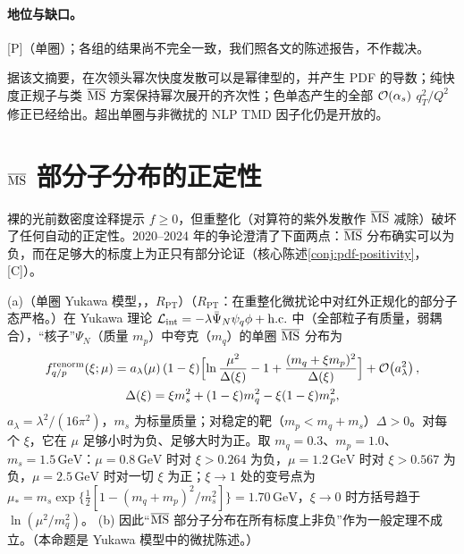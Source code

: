 \paragraph{地位与缺口。}[P]（单圈）；各组的结果尚不完全一致，我们照各文的陈述报告，不作裁决。

\begin{remark}[次领头幂次的幂律快度发散]\label{rem:front-power-rapidity}
据该文摘要\cite{Ebert:2018gsn}，在次领头幂次快度发散可以是幂律型的，并产生 PDF 的导数；纯快度正规子与类 $\overline{\mathrm{MS}}$ 方案保持幂次展开的齐次性；色单态产生的全部 $\mathcal{O}\!\left(\alpha_s\right)$ $q_T^2/Q^2$ 修正已经给出。超出单圈与非微扰的 NLP TMD 因子化仍是开放的。
\end{remark}

\section{$\overline{\mathrm{MS}}$ 部分子分布的正定性}\label{sec:front-positivity}

裸的光前数密度诠释提示 $f\ge0$，但重整化（对算符的紫外发散作 $\overline{\mathrm{MS}}$ 减除）破坏了任何自动的正定性。2020--2024 年的争论澄清了下面两点：$\overline{\mathrm{MS}}$ 分布确实可以为负，而在足够大的标度上为正只有部分论证（核心陈述\cref{conj:pdf-positivity}，[C]）。

\begin{proposition}\label{prop:front-msbar-negative}
(a)（单圈 Yukawa 模型，\tagR，$R_{\mathrm{PT}}$）（$R_{\mathrm{PT}}$：在重整化微扰论中对红外正规化的部分子态严格。）在 Yukawa 理论 $\mathcal L_{\rm int}=-\lambda\bar\Psi_N\psi_q\phi+{\rm h.c.}$ 中（全部粒子有质量，弱耦合），“核子”$\Psi_N$（质量 $m_p$）中夸克（$m_q$）的单圈 $\overline{\mathrm{MS}}$ 分布为
\begin{equation}\label{eq:front-yukawa}
\begin{gathered}
f^{\rm renorm}_{q/p}(\xi;\mu)=a_\lambda(\mu)\,(1-\xi)\Bigl[\ln\frac{\mu^2}{\Delta(\xi)}-1+\frac{(m_q+\xi m_p)^2}{\Delta(\xi)}\Bigr]+\mathcal{O}\!\left(a_\lambda^2\right),\\
\Delta(\xi)=\xi m_s^2+(1-\xi)m_q^2-\xi(1-\xi)m_p^2,
\end{gathered}
\end{equation}
$a_\lambda=\lambda^2/(16\pi^2)$，$m_s$ 为标量质量；对稳定的靶（$m_p<m_q+m_s$）$\Delta>0$。对每个 $\xi$，它在 $\mu$ 足够小时为负、足够大时为正。取 $m_q=0.3$、$m_p=1.0$、$m_s=1.5\,\mathrm{GeV}$：$\mu=0.8\,\mathrm{GeV}$ 时对 $\xi>0.264$ 为负，$\mu=1.2\,\mathrm{GeV}$ 时对 $\xi>0.567$ 为负，$\mu=2.5\,\mathrm{GeV}$ 时对一切 $\xi$ 为正；$\xi\to1$ 处的变号点为 $\mu_*=m_s\exp\{\frac12[1-(m_q+m_p)^2/m_s^2]\}=1.70\,\mathrm{GeV}$，$\xi\to0$ 时方括号趋于 $\ln(\mu^2/m_q^2)$。
(b) 因此“$\overline{\mathrm{MS}}$ 部分子分布在所有标度上非负”作为一般定理不成立。（本命题是 Yukawa 模型中的微扰陈述。）
\end{proposition}

